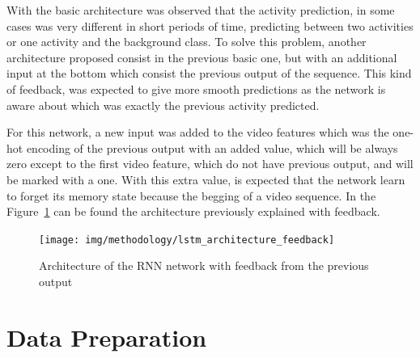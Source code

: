 With the basic architecture was observed that the activity prediction, in some cases was very different in short periods of time, predicting between two activities or one activity and the background class. To solve this problem, another architecture proposed consist in the previous basic one, but with an additional input at the bottom which consist the previous output of the sequence. This kind of feedback, was expected to give more smooth predictions as the network is aware about which was exactly the previous activity predicted.

For this network, a new input was added to the video features which was the one-hot encoding of the previous output with an added value, which will be always zero except to the first video feature, which do not have previous output, and will be marked with a one. With this extra value, is expected that the network learn to forget its memory state because the begging of a video sequence. In the Figure~\ref{fig:lstm_architecture_feedback} can be found the architecture previously explained with feedback.

\begin{figure}[H]
\begin{center}
\texttt{[image: img/methodology/lstm\_architecture\_feedback]}
\end{center}
\caption{Architecture of the RNN network with feedback from the previous output}
\label{fig:lstm_architecture_feedback}
\end{figure}





\section{Data Preparation}



